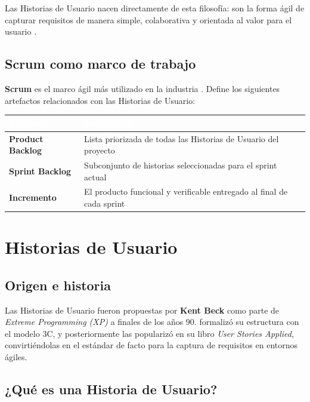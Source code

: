 \documentclass[12pt, a4paper]{article}
\begin{document}
\vspace{0.4cm}
Las Historias de Usuario nacen directamente de esta filosofía: son la forma
ágil de capturar requisitos de manera simple, colaborativa y orientada
al valor para el usuario \parencite{beck2001}.

\subsection{Scrum como marco de trabajo}

\textbf{Scrum} es el marco ágil más utilizado en la industria
\parencite{schwaber2020}. Define los siguientes artefactos relacionados
con las Historias de Usuario:

\vspace{0.3cm}
\begin{tabular}{>{\bfseries}p{3.5cm} p{9cm}}
  \toprule
  \rowcolor{espeazul}
  \textcolor{white}{Artefacto} & \textcolor{white}{Descripción} \\
  \midrule
  Product Backlog & Lista priorizada de todas las Historias de Usuario del proyecto \\
  Sprint Backlog  & Subconjunto de historias seleccionadas para el sprint actual \\
  Incremento      & El producto funcional y verificable entregado al final de cada sprint \\
  \bottomrule
\end{tabular}

\section{Historias de Usuario}

\subsection{Origen e historia}

Las Historias de Usuario fueron propuestas por \textbf{Kent Beck} como parte de
\textit{Extreme Programming (XP)} a finales de los años 90.
\textcite{jeffries2001} formalizó su estructura con el modelo 3C, y
posteriormente \textcite{cohn2004} las popularizó en su libro
\textit{User Stories Applied}, convirtiéndolas en el estándar de facto para
la captura de requisitos en entornos ágiles.

\subsection{¿Qué es una Historia de Usuario?}
\end{document}
